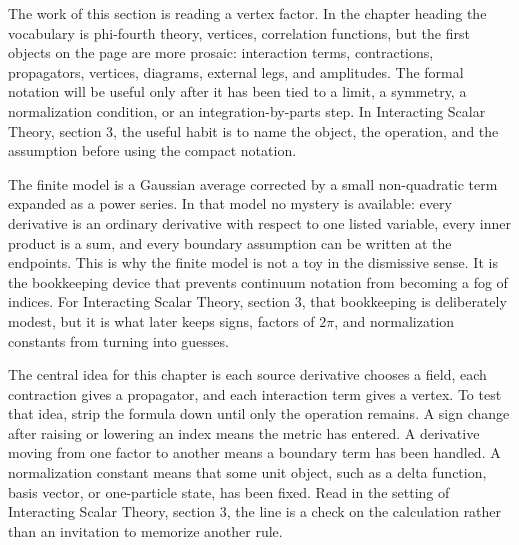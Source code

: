 











The work of this section is reading a vertex factor.  In the chapter heading the vocabulary is phi-fourth theory, vertices, correlation functions, but the first objects on the page are more prosaic: interaction terms, contractions, propagators, vertices, diagrams, external legs, and amplitudes.  The formal notation will be useful only after it has been tied to a limit, a symmetry, a normalization condition, or an integration-by-parts step.  In Interacting Scalar Theory, section 3, the useful habit is to name the object, the operation, and the assumption before using the compact notation.

The finite model is a Gaussian average corrected by a small non-quadratic term expanded as a power series.  In that model no mystery is available: every derivative is an ordinary derivative with respect to one listed variable, every inner product is a sum, and every boundary assumption can be written at the endpoints.  This is why the finite model is not a toy in the dismissive sense.  It is the bookkeeping device that prevents continuum notation from becoming a fog of indices.  For Interacting Scalar Theory, section 3, that bookkeeping is deliberately modest, but it is what later keeps signs, factors of \(2\pi\), and normalization constants from turning into guesses.

The central idea for this chapter is each source derivative chooses a field, each contraction gives a propagator, and each interaction term gives a vertex.  To test that idea, strip the formula down until only the operation remains.  A sign change after raising or lowering an index means the metric has entered.  A derivative moving from one factor to another means a boundary term has been handled.  A normalization constant means that some unit object, such as a delta function, basis vector, or one-particle state, has been fixed.  Read in the setting of Interacting Scalar Theory, section 3, the line is a check on the calculation rather than an invitation to memorize another rule.

